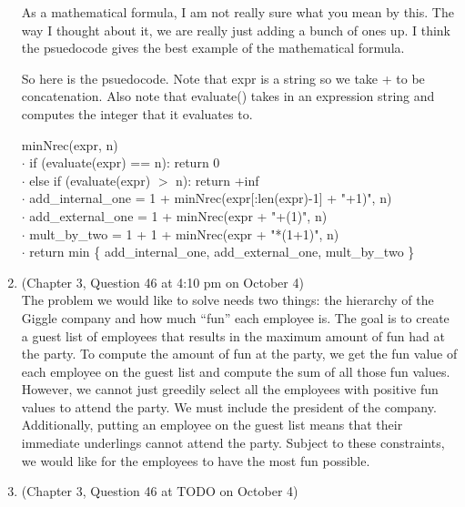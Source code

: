\documentclass{article}
\begin{document}
\begin{enumerate}
        As a mathematical formula, I am not really sure what you mean by this.
        The way I thought about it, we are really just adding a bunch of ones up.
        I think the psuedocode gives the best example of the mathematical formula.

        So here is the psuedocode.
        Note that expr is a string so we take + to be concatenation.
        Also note that evaluate() takes in an expression string and computes the integer that it evaluates to.

        \begin{algorithm}
            minNrec(expr, n) \\
            $\cdot$ \hspace{1.5em} if (evaluate(expr) == n): return 0 \\
            $\cdot$ \hspace{1.5em} else if (evaluate(expr) $>$ n): return +inf \\
            $\cdot$ \hspace{1.5em} add\_internal\_one = 1 + minNrec(expr[:len(expr)-1] + "+1)", n) \\
            $\cdot$ \hspace{1.5em} add\_external\_one = 1 + minNrec(expr + "+(1)", n) \\
            $\cdot$ \hspace{1.5em} mult\_by\_two = 1 + 1 + minNrec(expr + "*(1+1)", n) \\
            $\cdot$ \hspace{1.5em} return min \{ add\_internal\_one, add\_external\_one, mult\_by\_two \}
        \end{algorithm}
    \item (Chapter 3, Question 46 at 4:10 pm on October 4) \\
        The problem we would like to solve needs two things: the hierarchy of the Giggle company and how much ``fun'' each employee is.
        The goal is to create a guest list of employees that results in the maximum amount of fun had at the party.
        To compute the amount of fun at the party, we get the fun value of each employee on the guest list and compute the sum of all those fun values.
        However, we cannot just greedily select all the employees with positive fun values to attend the party.
        We must include the president of the company.
        Additionally, putting an employee on the guest list means that their immediate underlings cannot attend the party.
        Subject to these constraints, we would like for the employees to have the most fun possible.
    \item (Chapter 3, Question 46 at TODO on October 4) \\
\end{enumerate}
\end{document}
